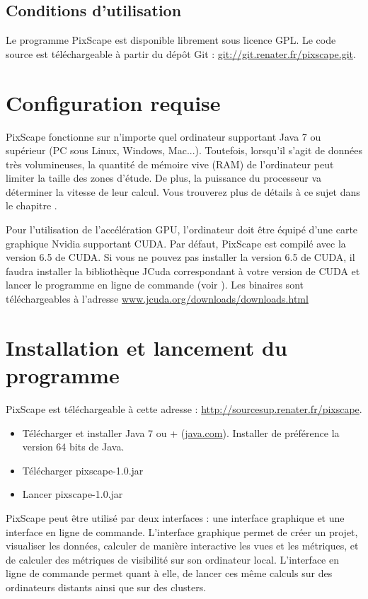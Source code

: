 \documentclass{report}
\begin{document}
\subsection{Conditions d’utilisation}
Le programme PixScape est disponible librement sous licence GPL. Le code source est téléchargeable à partir du dépôt Git : \url{git://git.renater.fr/pixscape.git}.


\section{Configuration requise}

PixScape fonctionne sur n'importe quel ordinateur supportant Java 7 ou supérieur (PC sous Linux, Windows, Mac...). Toutefois, lorsqu'il s'agit de données très volumineuses, la quantité de mémoire vive (RAM) de l’ordinateur peut limiter la taille des zones d'étude. De plus, la puissance du processeur va déterminer la vitesse de leur calcul. Vous trouverez plus de détails à ce sujet dans le chapitre . 

Pour l'utilisation de l'accélération GPU, l'ordinateur doit être équipé d'une carte graphique Nvidia supportant CUDA. Par défaut, PixScape est compilé avec la version 6.5 de CUDA. Si vous ne pouvez pas installer la version 6.5 de CUDA, il faudra installer la bibliothèque JCuda correspondant à votre version de CUDA et lancer le programme en ligne de commande (voir ). Les binaires sont téléchargeables à l'adresse \href{http://www.jcuda.org/downloads/downloads.html}{www.jcuda.org/downloads/downloads.html}

\section{Installation et lancement du programme}

PixScape est téléchargeable à cette adresse : \url{http://sourcesup.renater.fr/pixscape}.

\begin{itemize}
	\item Télécharger et installer Java 7 ou + (\href{http://www.java.com}{java.com}). Installer de préférence la version 64 bits de Java.
	\item Télécharger pixscape-1.0.jar
	\item Lancer pixscape-1.0.jar
\end{itemize}

PixScape peut être utilisé par deux interfaces : une interface graphique et une interface en ligne de commande.
L'interface graphique permet de créer un projet, visualiser les données, calculer de manière interactive les vues et les métriques, et de calculer des métriques de visibilité sur son ordinateur local. L'interface en ligne de commande permet quant à elle, de lancer ces même calculs sur des ordinateurs distants ainsi que sur des clusters.
\end{document}
